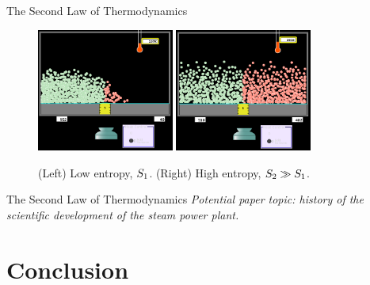 \documentclass{beamer}
\begin{document}
\begin{frame}{The Second Law of Thermodynamics}
\begin{figure}
\centering
\includegraphics[width=0.4\textwidth]{figures/S1.png}
\includegraphics[width=0.4\textwidth]{figures/S2.png}
\caption{\label{fig:s} (Left) Low entropy, $S_{\rm 1}$.  (Right) High entropy, $S_{\rm 2} \gg S_{\rm 1}$.}
\end{figure}
\end{frame}

\begin{frame}{The Second Law of Thermodynamics}
\textit{Potential paper topic: history of the scientific development of the steam power plant.}
\end{frame}

\section{Conclusion}
\end{document}
